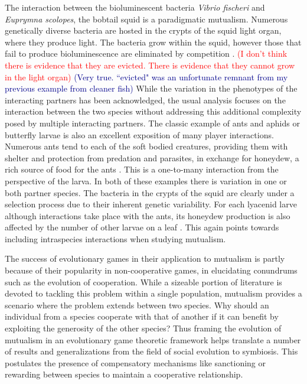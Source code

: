 \documentclass[12pt]{article}
\newcommand{\cha}[1]{\textcolor{darkblue}{(#1)}}
\newcommand{\paul}[1]{\textcolor{red}{(#1)}}
\begin{document}
The interaction between the bioluminescent bacteria \textit{Vibrio fischeri} and \textit{Euprymna scolopes}, the bobtail squid \citep{mcfallngai:PLoSB:2014} is a paradigmatic mutualism. 
Numerous genetically diverse bacteria are hosted in the crypts of the squid light organ, where they produce light. 
The bacteria grow within the squid, however those that fail to produce bioluminescence are eliminated by competition \citep{visick:JB:2000}.
\paul{I don't think there is evidence that they are evicted.  There is evidence that they cannot grow in the light organ}
\cha{Very true. ``evicted" was an unfortunate remnant from my previous example from cleaner fish}
While the variation in the phenotypes of the interacting partners has been acknowledged, the usual analysis focuses on the interaction between the two species without addressing this additional complexity posed by multiple interacting partners.
The classic example of ants and aphids or butterfly larvae \citep{pierce:BES:1987,hoelldobler:book:1990} is also an excellent exposition of many player interactions. 
Numerous ants tend to each of the soft bodied creatures, providing them with shelter and protection from predation and parasites, in exchange for honeydew, a rich source of food for the ants \citep{hill:OEC:1989,stadler:book:2008}.
This is a one-to-many interaction from the perspective of the larva.
In both of these examples there is variation in one or both partner species.
The bacteria in the crypts of the squid are clearly under a selection process due to their inherent genetic variability.
For each lyacenid larve although interactions take place with the ants, its honeydew production is also affected by the number of other larvae on a leaf \citep{axen:BE:1998}.
This again points towards including intraspecies interactions when studying mutualism.

The success of evolutionary games in their application to mutualism is partly because of their popularity in non-cooperative games, in elucidating conundrums such as the evolution of cooperation.
While a sizeable portion of literature is devoted to tackling this problem within a single population, mutualism provides a scenario where the problem extends between two species.
Why should an individual from a species cooperate with that of another if it can benefit by exploiting the generosity of the other species?
Thus framing the evolution of mutualism in an evolutionary game theoretic framework helps translate a number of results and generalizations from the field of social evolution to symbiosis. 
This postulates the presence of compensatory mechanisms like sanctioning or rewarding between species to maintain a cooperative relationship.
\end{document}
